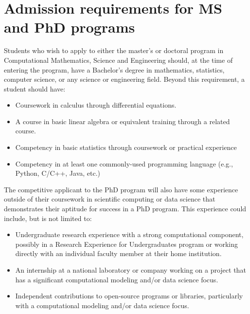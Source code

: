 \section{Admission requirements for MS and PhD programs}
\label{sec:grad_admission}

Students who wish to apply to either the master's or doctoral program in Computational
Mathematics, Science and Engineering should, at the time of entering
the program, have a Bachelor's degree in mathematics, statistics,
computer science, or any science or engineering field.  Beyond this
requirement, a student should have:

\begin{itemize}
\item Coursework in calculus through differential equations.

\item A course in basic linear algebra or equivalent training through
  a related course.

\item Competency in basic statistics through coursework or practical
  experience

\item Competency in at least one commonly-used programming language
  (e.g., Python, C/C++, Java, etc.)

\end{itemize}

The competitive applicant to the PhD program will also have some experience outside of
their coursework in scientific computing or data science that
demonstrates their aptitude for success in a PhD program.  This
experience could include, but is not limited to:  

\begin{itemize}
\item Undergraduate research experience with a strong computational
  component, possibly in a Research Experience for Undergraduates program or working directly with an
  individual faculty member at their home institution.

\item An internship at a national laboratory or company working on a
  project that has a significant computational modeling and/or data
  science focus.

\item Independent contributions to open-source programs or libraries,
  particularly with a computational modeling and/or data science
  focus.
\end{itemize}

